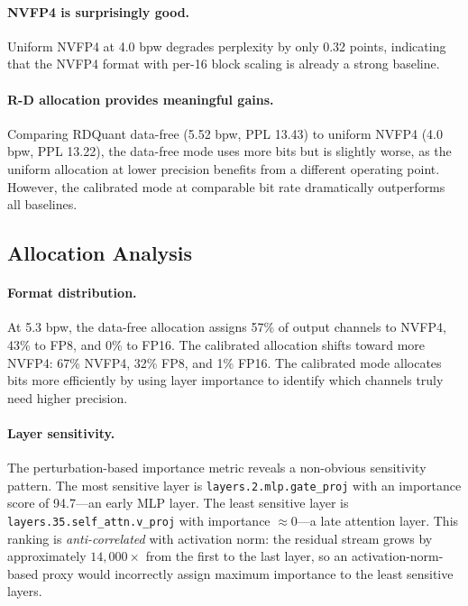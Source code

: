 \documentclass{article}
\begin{document}
\paragraph{NVFP4 is surprisingly good.}
Uniform NVFP4 at 4.0 bpw degrades perplexity by only 0.32 points, indicating that the NVFP4 format with per-16 block scaling is already a strong baseline.

\paragraph{R-D allocation provides meaningful gains.}
Comparing RDQuant data-free (5.52 bpw, PPL 13.43) to uniform NVFP4 (4.0 bpw, PPL 13.22), the data-free mode uses more bits but is slightly worse, as the uniform allocation at lower precision benefits from a different operating point.
However, the calibrated mode at comparable bit rate dramatically outperforms all baselines.

\subsection{Allocation Analysis}
\label{sec:allocation}

\paragraph{Format distribution.}
At 5.3 bpw, the data-free allocation assigns 57\% of output channels to NVFP4, 43\% to FP8, and 0\% to FP16.
The calibrated allocation shifts toward more NVFP4: 67\% NVFP4, 32\% FP8, and 1\% FP16.
The calibrated mode allocates bits more efficiently by using layer importance to identify which channels truly need higher precision.

\paragraph{Layer sensitivity.}
The perturbation-based importance metric reveals a non-obvious sensitivity pattern.
The most sensitive layer is \texttt{layers.2.mlp.gate\_proj} with an importance score of 94.7---an early MLP layer.
The least sensitive layer is \texttt{layers.35.self\_attn.v\_proj} with importance $\approx 0$---a late attention layer.
This ranking is \emph{anti-correlated} with activation norm: the residual stream grows by approximately $14{,}000\times$ from the first to the last layer, so an activation-norm-based proxy would incorrectly assign maximum importance to the least sensitive layers.
\end{document}
